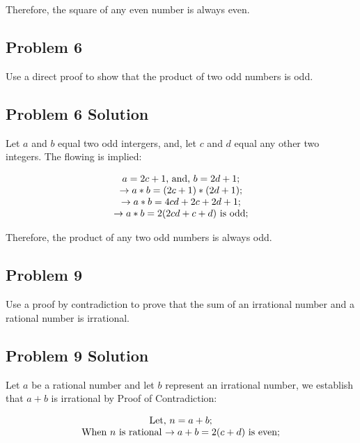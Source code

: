 \documentclass[11pt]{article}
\begin{document}
Therefore, the square of any even number is always even.

\subsection{Problem 6}

Use a direct proof to show that the product of two odd numbers is odd.

\subsection{Problem 6 Solution}

Let $a$ and $b$ equal two odd intergers, and, let $c$ and $d$ equal any other two integers. The flowing is implied:

\begin{displaymath}
\begin{tabular}{c}
$a = 2c+ 1$, and, $b = 2d+1;$ \\
$\to a * b = (2c + 1) * (2d + 1);$ \\
$\to  a * b = 4cd + 2c + 2d +1;$ \\
$\to  a * b = 2(2cd + c + d)$ is odd; \\
\end{tabular}
\end{displaymath}

Therefore, the product of any two odd numbers is always odd.

\subsection{Problem 9}

Use a proof by contradiction to prove that the sum of an irrational number and a rational number is irrational.

\subsection{Problem 9 Solution}

Let $a$ be a rational number and let $b$ represent an irrational number, we establish that {\bf $a + b$} is irrational by Proof of Contradiction:

\begin{displaymath}
\begin{tabular}{c}
Let, $n = a + b;$ \\
When $n$ is rational $\to a + b = 2(c + d)$ is even; \\
\end{tabular}
\end{displaymath}
\end{document}
